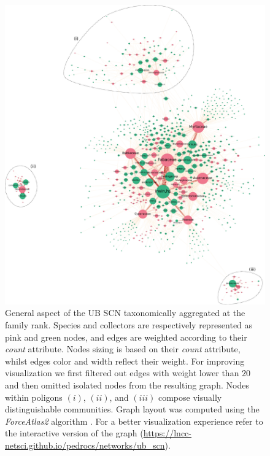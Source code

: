 \begin{figure}[!ht]
\centering
\includegraphics[width=\linewidth]{figures/casestudy_ub/scn_agg_family_general.pdf}
\caption[General aspect of the UB SCN taxonomically aggregated at the family rank.]{ General aspect of the UB SCN taxonomically aggregated at the family rank. Species and collectors are respectively represented as pink and green nodes, and edges are weighted according to their \textit{count} attribute. Nodes sizing is based on their \textit{count} attribute, whilst edges color and width reflect their weight. For improving visualization we first filtered out edges with weight lower than $20$ and then omitted isolated nodes from the resulting graph. Nodes within poligons $(i)$, $(ii)$, and $(iii)$ compose visually distinguishable communities. Graph layout was computed using the \textit{ForceAtlas2} algorithm \cite{Jacomy2014}. For a better visualization experience refer to the interactive version of the graph (\url{https://lncc-netsci.github.io/pedrocs/networks/ub_scn}). }
\label{fig:ub_scn_agg_family_general}
\end{figure}

